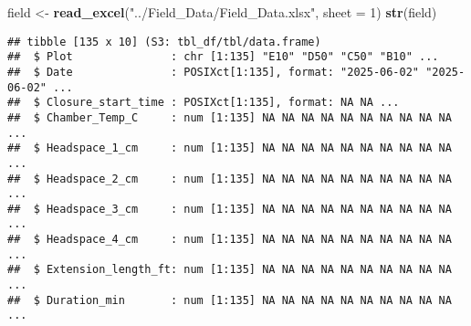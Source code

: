 \documentclass[
]{article}
\newenvironment{Shaded}{\begin{snugshade}}{\end{snugshade}}
\newcommand{\AttributeTok}[1]{\textcolor[rgb]{0.13,0.29,0.53}{#1}}
\newcommand{\DecValTok}[1]{\textcolor[rgb]{0.00,0.00,0.81}{#1}}
\newcommand{\FunctionTok}[1]{\textcolor[rgb]{0.13,0.29,0.53}{\textbf{#1}}}
\newcommand{\NormalTok}[1]{#1}
\newcommand{\OtherTok}[1]{\textcolor[rgb]{0.56,0.35,0.01}{#1}}
\newcommand{\StringTok}[1]{\textcolor[rgb]{0.31,0.60,0.02}{#1}}
\begin{document}
\begin{Shaded}
\begin{Highlighting}[]
\NormalTok{field }\OtherTok{\textless{}{-}} \FunctionTok{read\_excel}\NormalTok{(}\StringTok{"../Field\_Data/Field\_Data.xlsx"}\NormalTok{, }\AttributeTok{sheet =} \DecValTok{1}\NormalTok{)}
\FunctionTok{str}\NormalTok{(field)}
\end{Highlighting}
\end{Shaded}

\begin{verbatim}
## tibble [135 x 10] (S3: tbl_df/tbl/data.frame)
##  $ Plot               : chr [1:135] "E10" "D50" "C50" "B10" ...
##  $ Date               : POSIXct[1:135], format: "2025-06-02" "2025-06-02" ...
##  $ Closure_start_time : POSIXct[1:135], format: NA NA ...
##  $ Chamber_Temp_C     : num [1:135] NA NA NA NA NA NA NA NA NA NA ...
##  $ Headspace_1_cm     : num [1:135] NA NA NA NA NA NA NA NA NA NA ...
##  $ Headspace_2_cm     : num [1:135] NA NA NA NA NA NA NA NA NA NA ...
##  $ Headspace_3_cm     : num [1:135] NA NA NA NA NA NA NA NA NA NA ...
##  $ Headspace_4_cm     : num [1:135] NA NA NA NA NA NA NA NA NA NA ...
##  $ Extension_length_ft: num [1:135] NA NA NA NA NA NA NA NA NA NA ...
##  $ Duration_min       : num [1:135] NA NA NA NA NA NA NA NA NA NA ...
\end{verbatim}
\end{document}
